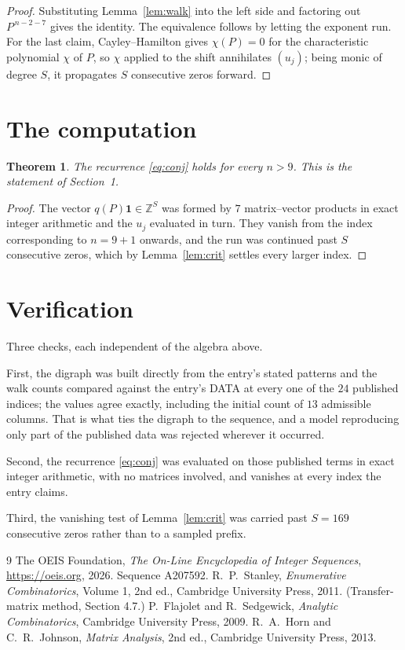 \documentclass[11pt,a4paper]{article}
\theoremstyle{plain}
\newtheorem{theorem}{Theorem}
\theoremstyle{definition}
\begin{document}
\begin{proof}
Substituting Lemma~\ref{lem:walk} into the left side and factoring out
$P^{\,n-2-7}$ gives the identity. The equivalence follows by letting the exponent
run. For the last claim, Cayley--Hamilton gives $\chi(P)=0$ for the characteristic
polynomial $\chi$ of $P$, so $\chi$ applied to the shift annihilates $(u_j)$; being monic of
degree $S$, it propagates $S$ consecutive zeros forward.
\end{proof}

\section{The computation}

\begin{theorem}
The recurrence \eqref{eq:conj} holds for every $n>9$. This is the statement of
Section~1.
\end{theorem}

\begin{proof}
The vector $q(P)\mathbf{1}\in\mathbb{Z}^{S}$ was formed by $7$ matrix--vector
products in exact integer arithmetic and the $u_j$ evaluated in turn. They vanish from the
index corresponding to $n=9+1$ onwards, and the run was continued past $S$ consecutive
zeros, which by Lemma~\ref{lem:crit} settles every larger index.
\end{proof}

\section{Verification}

Three checks, each independent of the algebra above.

First, the digraph was built directly from the entry's stated patterns and the walk counts
compared against the entry's DATA at every one of the $24$ published indices; the
values agree exactly, including the initial count of $13$ admissible columns. That is
what ties the digraph to the sequence, and a model reproducing only part of the published
data was rejected wherever it occurred.

Second, the recurrence \eqref{eq:conj} was evaluated on those published terms in exact
integer arithmetic, with no matrices involved, and vanishes at every index the entry claims.

Third, the vanishing test of Lemma~\ref{lem:crit} was carried past $S=169$ consecutive
zeros rather than to a sampled prefix.

\begin{thebibliography}{9}
 The OEIS Foundation, \emph{The On-Line Encyclopedia of Integer
Sequences}, \url{https://oeis.org}, 2026. Sequence A207592.
 R.~P.~Stanley, \emph{Enumerative Combinatorics}, Volume 1, 2nd ed.,
Cambridge University Press, 2011. (Transfer-matrix method, Section 4.7.)
 P.~Flajolet and R.~Sedgewick, \emph{Analytic Combinatorics}, Cambridge
University Press, 2009.
 R.~A.~Horn and C.~R.~Johnson, \emph{Matrix Analysis}, 2nd ed., Cambridge
University Press, 2013.
\end{thebibliography}
\end{document}
